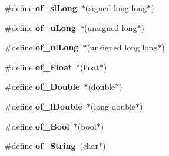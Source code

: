 \begin{DoxyCompactItemize}
\item 
\#define {\bfseries of\+\_\+sl\+Long}~$\ast$(signed long long$\ast$)\label{group__prep__group_gabd16ef323cea08f78278d94e7afc9a96}

\item 
\#define {\bfseries of\+\_\+u\+Long}~$\ast$(unsigned long$\ast$)\label{group__prep__group_ga90a21dace6a26e9621c450c457d1de75}

\item 
\#define {\bfseries of\+\_\+ul\+Long}~$\ast$(unsigned long long$\ast$)\label{group__prep__group_ga3e7eebc5340362dc526a7e88d5ceba6a}

\item 
\#define {\bfseries of\+\_\+\+Float}~$\ast$(float$\ast$)\label{group__prep__group_gafe0bc3592b5f8c7eb00d0cc1a329400a}

\item 
\#define {\bfseries of\+\_\+\+Double}~$\ast$(double$\ast$)\label{group__prep__group_ga6b0f1440a5eafde45f7de6e3fe5bc0a1}

\item 
\#define {\bfseries of\+\_\+l\+Double}~$\ast$(long double$\ast$)\label{group__prep__group_gacd514a033626484b018828fbf1dafcde}

\item 
\#define {\bfseries of\+\_\+\+Bool}~$\ast$(bool$\ast$)\label{group__prep__group_gaf998c625df8bb0979492bdc6331e7cf5}

\item 
\#define {\bfseries of\+\_\+\+String}~(char$\ast$)\label{group__prep__group_ga905845e335099d8083b3db6e92615ae0}


\end{DoxyCompactItemize}

